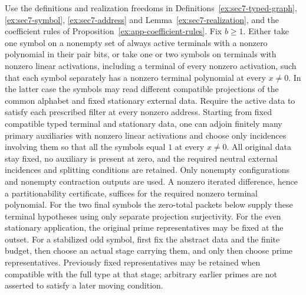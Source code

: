 \begin{proposition}\label{ex:app-simultaneous-address}
Use the definitions and realization freedoms in
Definitions~\ref{ex:sec7-typed-graph}, \ref{ex:sec7-symbol},
\ref{ex:sec7-address} and Lemma~\ref{ex:sec7-realization},
and the coefficient rules of Proposition~\ref{ex:app-coefficient-rules}.
Fix $b\ge1$. Either take one symbol on a nonempty set of always
active terminals with a nonzero polynomial in their pair bits, or
take one or two symbols on terminals with nonzero linear activations,
including a terminal of every nonzero activation, such that each
symbol separately has a nonzero terminal polynomial at every
$x\ne0$. In the latter case the symbols may read different
compatible projections of the common alphabet and fixed stationary
external data. Require the active data to satisfy each prescribed
filter at every nonzero address.
Starting from fixed compatible typed terminal and stationary
data, one can adjoin finitely many primary auxiliaries with nonzero
linear activations and choose only incidences involving them so that
all the symbols equal $1$ at every $x\ne0$. All original data stay
fixed, no auxiliary is present at zero, and the required neutral
external incidences and splitting conditions are retained.
Only nonempty configurations and nonempty contraction outputs are
used. A nonzero iterated difference, hence a partitionability
certificate, suffices for the required nonzero terminal polynomial.
For the two final symbols the zero-total packets below supply these
terminal hypotheses using only separate projection surjectivity.
For the even stationary application, the original prime representatives
may be fixed at the outset. For a stabilized odd symbol, first fix the
abstract data and the finite budget, then choose an actual stage
carrying them, and only then choose prime representatives. Previously
fixed representatives may be retained when compatible with the full
type at that stage; arbitrary earlier primes are not asserted to
satisfy a later moving condition.
\end{proposition}
